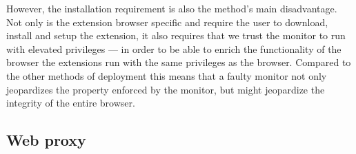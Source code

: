 \documentclass{llncs}
\begin{document}
However, the installation requirement is also the method's main disadvantage.
Not only is the extension browser specific and require the user to download,
install and setup the extension, it also requires that we trust the monitor to
run with elevated privileges --- in order to be able to enrich the
functionality of the browser the extensions run with the same privileges as the
browser. Compared to the other methods of deployment this means that a faulty
monitor not only jeopardizes the property enforced by the monitor, but might
jeopardize the integrity of the entire browser.


\subsection{Web proxy}

\end{document}
